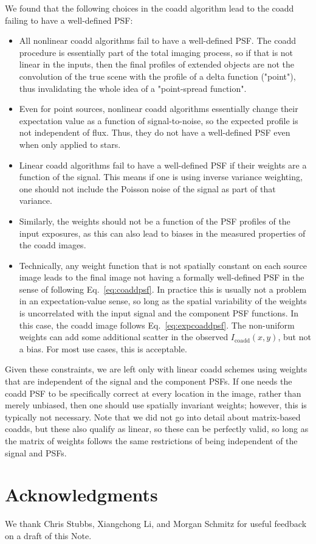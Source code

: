 \documentclass[modern]{style_and_logos/lsstdescnote}
\begin{document}
We found that the following choices in the coadd algorithm lead to the coadd failing to
have a well-defined PSF:
\begin{itemize}
    \item All nonlinear coadd algorithms fail to have a well-defined PSF.  The coadd procedure is essentially part of the total imaging process, so if that is not linear in the inputs, then the final profiles of extended objects are not the convolution of the true scene with the profile of a delta function ("point"), thus invalidating the whole idea of a "point-spread function".
    \item Even for point sources, nonlinear coadd algorithms essentially change their expectation value as a function of signal-to-noise, so the expected profile is not independent of flux.  Thus, they do not have a well-defined PSF even when only applied to stars.
    \item Linear coadd algorithms fail to have a well-defined PSF if their weights are a function of the signal.  This means if one is using inverse variance weighting, one should not include the Poisson noise of the signal as part of that variance.
    \item Similarly, the weights should not be a function of the PSF profiles of the input exposures, as this can also lead to biases in the measured properties of the coadd images.
    \item Technically, any weight function that is not spatially constant on each source image leads to the final image not having a formally well-defined PSF in the sense of following Eq.~\eqref{eq:coaddpsf}.  In practice this is usually not a problem in an expectation-value sense, so long as the spatial variability of the weights is uncorrelated with the input signal and the component PSF functions.  In this case, the coadd image follows Eq.~\eqref{eq:expcoaddpsf}. The non-uniform weights can add some additional scatter in the observed $I_\mathrm{coadd}(x,y)$, but not a bias.  For most use cases, this is acceptable.
\end{itemize}

Given these constraints, we are left only with linear coadd schemes using weights that are independent of the signal and the component PSFs.  If one needs the coadd PSF to be specifically correct at every location in the image, rather than merely unbiased, then one should use spatially invariant weights; however, this is typically not necessary. Note that we did not go into detail about matrix-based coadds, but these also qualify as linear, so these can be perfectly valid, so long as the matrix of weights follows the same restrictions of being independent of the signal and PSFs.

\section*{Acknowledgments}

We thank Chris Stubbs, Xiangchong Li, and Morgan Schmitz for useful feedback on a draft of this Note.


  
\end{document}
